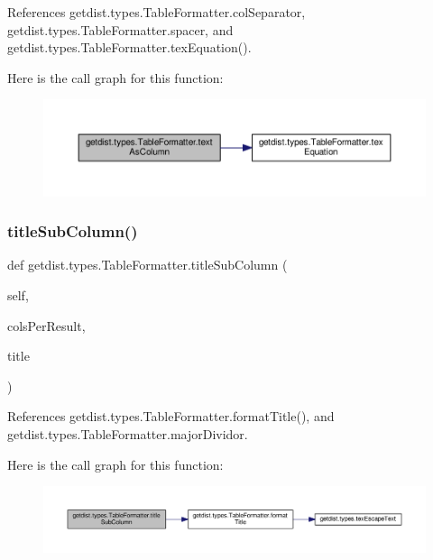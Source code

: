 References getdist.\+types.\+Table\+Formatter.\+col\+Separator, getdist.\+types.\+Table\+Formatter.\+spacer, and getdist.\+types.\+Table\+Formatter.\+tex\+Equation().

Here is the call graph for this function\+:
\nopagebreak
\begin{figure}[H]
\begin{center}
\leavevmode
\includegraphics[width=350pt]{classgetdist_1_1types_1_1TableFormatter_a620c7f462cff21151aa70de66d9cd85d_cgraph}
\end{center}
\end{figure}
\mbox{\label{classgetdist_1_1types_1_1TableFormatter_afebe25d2181546c9dfd54e4b08b42edf}} 
\subsubsection{\texorpdfstring{title\+Sub\+Column()}{titleSubColumn()}}
{\footnotesize\ttfamily def getdist.\+types.\+Table\+Formatter.\+title\+Sub\+Column (\begin{DoxyParamCaption}\item[{}]{self,  }\item[{}]{cols\+Per\+Result,  }\item[{}]{title }\end{DoxyParamCaption})}



References getdist.\+types.\+Table\+Formatter.\+format\+Title(), and getdist.\+types.\+Table\+Formatter.\+major\+Dividor.

Here is the call graph for this function\+:
\nopagebreak
\begin{figure}[H]
\begin{center}
\leavevmode
\includegraphics[width=350pt]{classgetdist_1_1types_1_1TableFormatter_afebe25d2181546c9dfd54e4b08b42edf_cgraph}
\end{center}
\end{figure}



